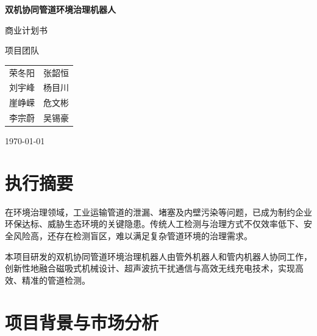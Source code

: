 \documentclass[12pt, a4paper]{article}
\let\oldsection\section
\renewcommand{\section}{\FloatBarrier\oldsection}
\begin{document}
\begin{titlepage}
    \centering
    
    \vspace*{3cm}
    
    {\Huge\bfseries 双机协同管道环境治理机器人\par}
    \vspace{0.5cm}
    {\LARGE 商业计划书\par}

    \vspace{2.5cm}
    {\Large 项目团队\par}
    \vspace{0.8cm}

    \large
    \begin{minipage}{0.8\textwidth}
        \centering
        \begin{tabular}{cc}
            荣冬阳 & 张韶恒 \\
            刘宇峰 & 杨目川\\
            崖峥嵘 & 危文彬 \\
            李宗蔚 & 吴锡豪\\
        \end{tabular}
    \end{minipage}
    
    \vspace{2.5cm}
    {\large \today\par}
    
    \vfill
    
\end{titlepage}

\tableofcontents
\newpage

\section{执行摘要}

在环境治理领域，工业运输管道的泄漏、堵塞及内壁污染等问题，已成为制约企业环保达标、威胁生态环境的关键隐患。传统人工检测与治理方式不仅效率低下、安全风险高，还存在检测盲区，难以满足复杂管道环境的治理需求。

本项目研发的双机协同管道环境治理机器人由管外机器人和管内机器人协同工作，创新性地融合磁吸式机械设计、超声波抗干扰通信与高效无线充电技术，实现高效、精准的管道检测。

\section{项目背景与市场分析}
\end{document}
